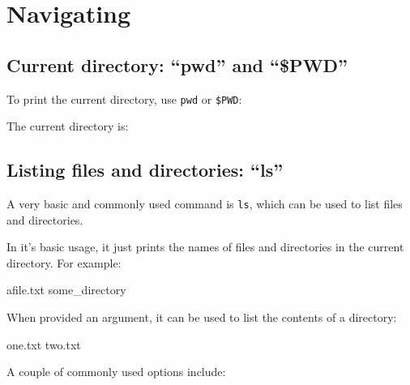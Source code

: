 \chapter{Navigating}

\section{Current directory: ``pwd'' and ``\$PWD''}

To print the current directory, use \lstinline|pwd| or \lstinline|$PWD|:

\begin{prompt}
The current directory is: %
\end{prompt}

\section{Listing files and directories: ``ls''}

A very basic and commonly used command is \lstinline|ls|, which can be used to list files and directories.

In it's basic usage, it just prints the names of files and directories in the current directory. For example:

\begin{prompt}
afile.txt   some_directory
\end{prompt}

When provided an argument, it can be used to list the contents of a directory:

\begin{prompt}
one.txt  two.txt
\end{prompt}

A couple of commonly used options include:

